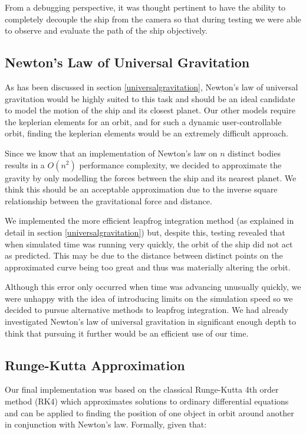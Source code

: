 From a debugging perspective, it was thought pertinent to have the ability to completely decouple the ship from the camera so that during testing we were able to observe and evaluate the path of the ship objectively.

\subsection{Newton's Law of Universal Gravitation}
As has been discussed in section \cref{universalgravitation}, Newton's law of universal gravitation would be highly suited to this task and should be an ideal candidate to model the motion of the ship and its closest planet.  Our other models require the keplerian elements for an orbit, and for such a dynamic user-controllable orbit, finding the keplerian elements would be an extremely difficult approach.

Since we know that an implementation of Newton's law on $n$ distinct bodies results in a $O(n^2)$ performance complexity, we decided to approximate the gravity by only modelling the forces between the ship and its nearest planet.  We think this should be an acceptable approximation due to the inverse square relationship between the gravitational force and distance.

We implemented the more efficient leapfrog integration method (as explained in detail in section \cref{universalgravitation}) but, despite this, testing revealed that when simulated time was running very quickly, the orbit of the ship did not act as predicted.  This may be due to the distance between distinct points on the approximated curve being too great and thus was materially altering the orbit.

Although this error only occurred when time was advancing unusually quickly, we were unhappy with the idea of introducing limits on the simulation speed so we decided to pursue alternative methods to leapfrog integration.  We had already investigated Newton's law of universal gravitation in significant enough depth to think that pursuing it further would be an efficient use of our time.

\subsection{Runge-Kutta Approximation}
Our final implementation was based on the classical Runge-Kutta 4th order method (RK4) which approximates solutions to ordinary differential equations and can be applied to finding the position of one object in orbit around another in conjunction with Newton's law.  Formally, given that:

